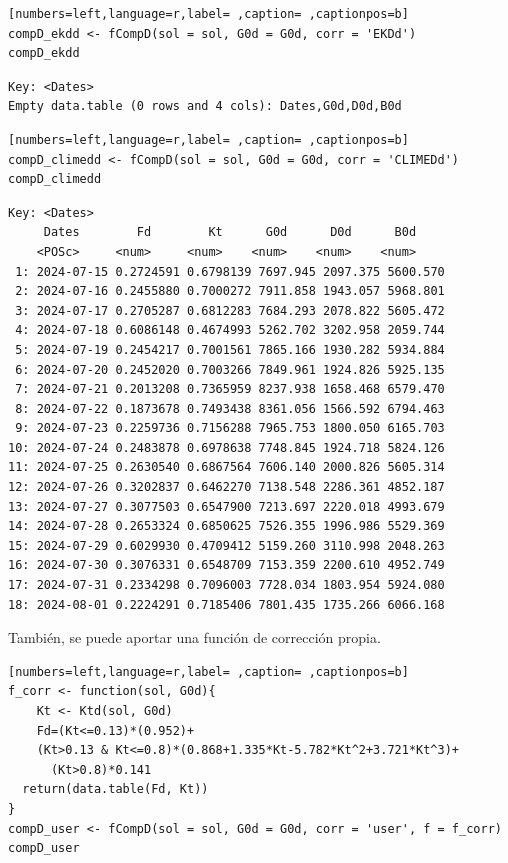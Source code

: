 \begin{itemize}
\begin{lstlisting}[numbers=left,language=r,label= ,caption= ,captionpos=b]
compD_ekdd <- fCompD(sol = sol, G0d = G0d, corr = 'EKDd')
compD_ekdd
\end{lstlisting}

\begin{verbatim}
Key: <Dates>
Empty data.table (0 rows and 4 cols): Dates,G0d,D0d,B0d
\end{verbatim}


\begin{lstlisting}[numbers=left,language=r,label= ,caption= ,captionpos=b]
compD_climedd <- fCompD(sol = sol, G0d = G0d, corr = 'CLIMEDd')
compD_climedd
\end{lstlisting}

\begin{verbatim}
Key: <Dates>
	 Dates        Fd        Kt      G0d      D0d      B0d
	<POSc>     <num>     <num>    <num>    <num>    <num>
 1: 2024-07-15 0.2724591 0.6798139 7697.945 2097.375 5600.570
 2: 2024-07-16 0.2455880 0.7000272 7911.858 1943.057 5968.801
 3: 2024-07-17 0.2705287 0.6812283 7684.293 2078.822 5605.472
 4: 2024-07-18 0.6086148 0.4674993 5262.702 3202.958 2059.744
 5: 2024-07-19 0.2454217 0.7001561 7865.166 1930.282 5934.884
 6: 2024-07-20 0.2452020 0.7003266 7849.961 1924.826 5925.135
 7: 2024-07-21 0.2013208 0.7365959 8237.938 1658.468 6579.470
 8: 2024-07-22 0.1873678 0.7493438 8361.056 1566.592 6794.463
 9: 2024-07-23 0.2259736 0.7156288 7965.753 1800.050 6165.703
10: 2024-07-24 0.2483878 0.6978638 7748.845 1924.718 5824.126
11: 2024-07-25 0.2630540 0.6867564 7606.140 2000.826 5605.314
12: 2024-07-26 0.3202837 0.6462270 7138.548 2286.361 4852.187
13: 2024-07-27 0.3077503 0.6547900 7213.697 2220.018 4993.679
14: 2024-07-28 0.2653324 0.6850625 7526.355 1996.986 5529.369
15: 2024-07-29 0.6029930 0.4709412 5159.260 3110.998 2048.263
16: 2024-07-30 0.3076331 0.6548709 7153.359 2200.610 4952.749
17: 2024-07-31 0.2334298 0.7096003 7728.034 1803.954 5924.080
18: 2024-08-01 0.2224291 0.7185406 7801.435 1735.266 6066.168
\end{verbatim}

También, se puede aportar una función de corrección propia.
\begin{lstlisting}[numbers=left,language=r,label= ,caption= ,captionpos=b]
f_corr <- function(sol, G0d){
    Kt <- Ktd(sol, G0d)
    Fd=(Kt<=0.13)*(0.952)+
    (Kt>0.13 & Kt<=0.8)*(0.868+1.335*Kt-5.782*Kt^2+3.721*Kt^3)+
      (Kt>0.8)*0.141
  return(data.table(Fd, Kt))
}
compD_user <- fCompD(sol = sol, G0d = G0d, corr = 'user', f = f_corr)
compD_user
\end{lstlisting}


\end{itemize}
